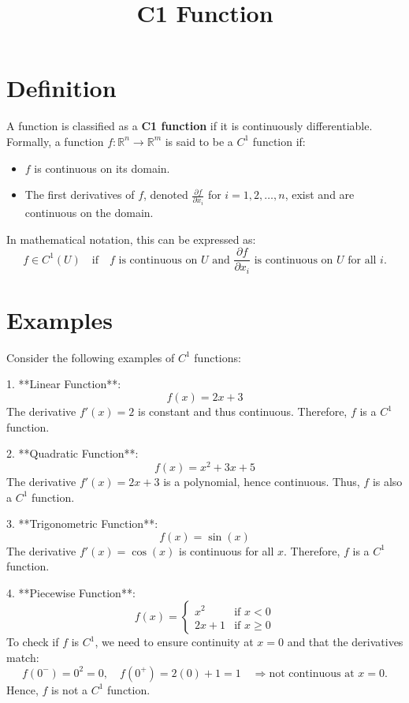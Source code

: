 \documentclass[11pt,a4paper]{article}
\title{C1 Function}
\date{}
\begin{document}
\maketitle
\section{Definition}
A function is classified as a \textbf{C1 function} if it is continuously differentiable. Formally, a function \( f: \mathbb{R}^n \to \mathbb{R}^m \) is said to be a \( C^1 \) function if:
\begin{itemize}
    \item \( f \) is continuous on its domain.
    \item The first derivatives of \( f \), denoted \( \frac{\partial f}{\partial x_i} \) for \( i = 1, 2, \ldots, n \), exist and are continuous on the domain.
\end{itemize}
In mathematical notation, this can be expressed as:
\[
f \in C^1(U) \quad \text{if} \quad f \text{ is continuous on } U \text{ and } \frac{\partial f}{\partial x_i} \text{ is continuous on } U \text{ for all } i.
\]

\section{Examples}
Consider the following examples of \( C^1 \) functions:

1. **Linear Function**: 
   \[
   f(x) = 2x + 3
   \]
   The derivative \( f'(x) = 2 \) is constant and thus continuous. Therefore, \( f \) is a \( C^1 \) function.

2. **Quadratic Function**: 
   \[
   f(x) = x^2 + 3x + 5
   \]
   The derivative \( f'(x) = 2x + 3 \) is a polynomial, hence continuous. Thus, \( f \) is also a \( C^1 \) function.

3. **Trigonometric Function**: 
   \[
   f(x) = \sin(x)
   \]
   The derivative \( f'(x) = \cos(x) \) is continuous for all \( x \). Therefore, \( f \) is a \( C^1 \) function.

4. **Piecewise Function**: 
   \[
   f(x) = 
   \begin{cases} 
   x^2 & \text{if } x < 0 \\
   2x + 1 & \text{if } x \geq 0 
   \end{cases}
   \]
   To check if \( f \) is \( C^1 \), we need to ensure continuity at \( x = 0 \) and that the derivatives match:
   \[
   f(0^-) = 0^2 = 0, \quad f(0^+) = 2(0) + 1 = 1 \quad \Rightarrow \text{not continuous at } x = 0.
   \]
   Hence, \( f \) is not a \( C^1 \) function.
\end{document}
